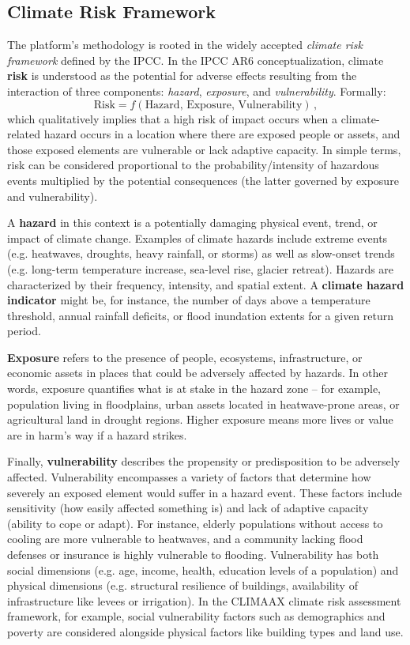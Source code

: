 \documentclass[10pt, conference]{IEEEtran}
\begin{document}
\subsection{Climate Risk Framework}
The platform’s methodology is rooted in the widely accepted \textit{climate risk framework} defined by the IPCC. In the IPCC AR6 conceptualization, climate \textbf{risk} is understood as the potential for adverse effects resulting from the interaction of three components: \textit{hazard}, \textit{exposure}, and \textit{vulnerability}. Formally:
\begin{equation}
    \text{Risk} = f(\text{Hazard},\, \text{Exposure},\, \text{Vulnerability})\,,
\end{equation}
which qualitatively implies that a high risk of impact occurs when a climate-related hazard occurs in a location where there are exposed people or assets, and those exposed elements are vulnerable or lack adaptive capacity. In simple terms, risk can be considered proportional to the probability/intensity of hazardous events multiplied by the potential consequences (the latter governed by exposure and vulnerability).

A \textbf{hazard} in this context is a potentially damaging physical event, trend, or impact of climate change. Examples of climate hazards include extreme events (e.g. heatwaves, droughts, heavy rainfall, or storms) as well as slow-onset trends (e.g. long-term temperature increase, sea-level rise, glacier retreat). Hazards are characterized by their frequency, intensity, and spatial extent. A \textbf{climate hazard indicator} might be, for instance, the number of days above a temperature threshold, annual rainfall deficits, or flood inundation extents for a given return period.

\textbf{Exposure} refers to the presence of people, ecosystems, infrastructure, or economic assets in places that could be adversely affected by hazards. In other words, exposure quantifies what is at stake in the hazard zone – for example, population living in floodplains, urban assets located in heatwave-prone areas, or agricultural land in drought regions. Higher exposure means more lives or value are in harm’s way if a hazard strikes.

Finally, \textbf{vulnerability} describes the propensity or predisposition to be adversely affected. Vulnerability encompasses a variety of factors that determine how severely an exposed element would suffer in a hazard event. These factors include sensitivity (how easily affected something is) and lack of adaptive capacity (ability to cope or adapt). For instance, elderly populations without access to cooling are more vulnerable to heatwaves, and a community lacking flood defenses or insurance is highly vulnerable to flooding. Vulnerability has both social dimensions (e.g. age, income, health, education levels of a population) and physical dimensions (e.g. structural resilience of buildings, availability of infrastructure like levees or irrigation). In the CLIMAAX climate risk assessment framework, for example, social vulnerability factors such as demographics and poverty are considered alongside physical factors like building types and land use.
\end{document}
